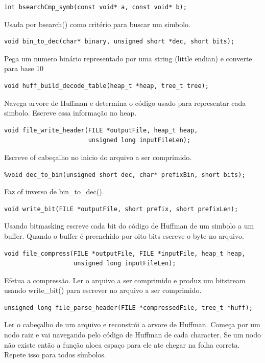 \documentclass[a4paper, 11pt]{article}
\begin{document}
\begin{verbatim}
int bsearchCmp_symb(const void* a, const void* b);
\end{verbatim} 
Usada por bsearch() como critério para buscar um simbolo.

\begin{verbatim}
void bin_to_dec(char* binary, unsigned short *dec, short bits);
\end{verbatim} 
Pega um numero binário representado por uma string (little endian) e converte para base 10

\begin{verbatim}
void huff_build_decode_table(heap_t *heap, tree_t tree);
\end{verbatim} 
Navega arvore de Huffman e determina o código usado para representar cada simbolo. Escreve essa informação no heap.

\begin{verbatim}
void file_write_header(FILE *outputFile, heap_t heap, 
                       unsigned long inputFileLen);
\end{verbatim} 
Escreve of cabeçalho no inicio do arquivo a ser comprimido.

\begin{verbatim}
%void dec_to_bin(unsigned short dec, char* prefixBin, short bits);
\end{verbatim} 
Faz of inverso de bin\_to\_dec().

\begin{verbatim}
void write_bit(FILE *outputFile, short prefix, short prefixLen);
\end{verbatim} 
Usando bitmasking escreve cada bit do código de Huffman de um simbolo a um buffer. Quando o buffer é preenchido por oito bits escreve o byte no arquivo.

\begin{verbatim}
void file_compress(FILE *outputFile, FILE *inputFile, heap_t heap, 
                   unsigned long inputFileLen);
\end{verbatim} 
Efetua a compressão. Ler o arquivo a ser comprimido e produz um bitstream usando write\_bit() para escrever no arquivo a ser comprimido.

\begin{verbatim}
unsigned long file_parse_header(FILE *compressedFile, tree_t *huff);
\end{verbatim} 
Ler o cabeçalho de um arquivo e reconstrói a arvore de Huffman. Começa por um nodo raiz e vai navegando pelo código de Huffman de cada character. Se um nodo não existe então a função aloca espaço para ele ate chegar na folha correta. Repete isso para todos símbolos.
\end{document}
